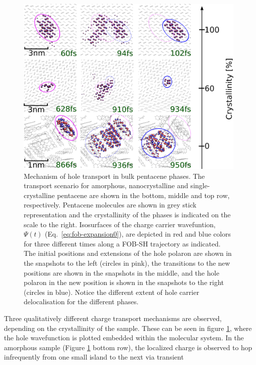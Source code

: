 \begin{figure}[htp]
  \includegraphics[width=\linewidth]{../img/DifferentQuenchTimes/ipr_3_samples.png}
  \caption{\label{fig:IPR}
  Mechanism of hole transport in bulk pentacene phases.
   The transport scenario for amorphous, nanocrystalline and single-crystalline pentacene are shown in the bottom, middle
  and top row, respectively. Pentacene molecules are shown in grey stick representation and the crystallinity of the phases is indicated on the scale to the right.
  Isosurfaces of the charge carrier wavefuntion, $\Psi (t)$ (Eq.~\ref{eq:fob-expansion0}), are depicted in red and blue colors for three different times along a FOB-SH trajectory
	as indicated.  The initial positions and extensions of the hole polaron are shown in the snapshots to the left (circles in pink), the transitions to the
  new positions are shown in the snapshots in the middle, and the hole polaron in the new position is shown in the snapshots to the right (circles in blue).
  Notice the different extent of hole carrier delocalisation for the different phases.}
\end{figure}
Three qualitatively different charge transport mechanisms are observed, depending on the crystallinity of the sample. These can be seen in figure \ref{fig:IPR}, where the hole wavefunction is plotted embedded within the molecular system.
In the amorphous sample (Figure \ref{fig:IPR} bottom row), the localized charge is observed to hop infrequently from one small island to the next via transient
